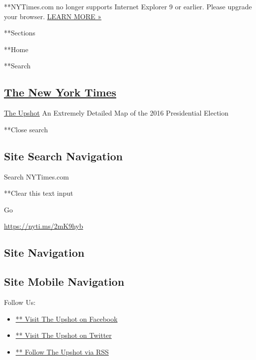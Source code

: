  **NYTimes.com no longer supports Internet Explorer 9 or earlier. Please
upgrade your browser.
\href{http://www.nytimes3xbfgragh.onion/content/help/site/ie9-support.html}{LEARN
MORE »}

**Sections

**Home

**Search

\hypertarget{the-new-york-times}{%
\subsection{\texorpdfstring{\href{http://www.nytimes3xbfgragh.onion/}{The
New York Times}}{The New York Times}}\label{the-new-york-times}}

 \href{https://www.nytimes3xbfgragh.onion/section/upshot}{The Upshot}
\textbar{}An Extremely Detailed Map of the 2016 Presidential Election

**Close search

\hypertarget{site-search-navigation}{%
\subsection{Site Search Navigation}\label{site-search-navigation}}

Search NYTimes.com

**Clear this text input

Go

\url{https://nyti.ms/2mK9hyb}

\hypertarget{site-navigation}{%
\subsection{Site Navigation}\label{site-navigation}}

\hypertarget{site-mobile-navigation}{%
\subsection{Site Mobile Navigation}\label{site-mobile-navigation}}

Follow Us:

\begin{itemize}
\tightlist
\item
  \href{https://www.facebookcorewwwi.onion/Upshot}{** Visit The Upshot
  on Facebook}
\item
  \href{https://twitter.com/intent/user?screen_name=UpshotNYT}{** Visit
  The Upshot on Twitter}
\item
  \href{http://rss.nytimes3xbfgragh.onion/services/xml/rss/nyt/Upshot.xml}{**
  Follow The Upshot via RSS}
\end{itemize}

